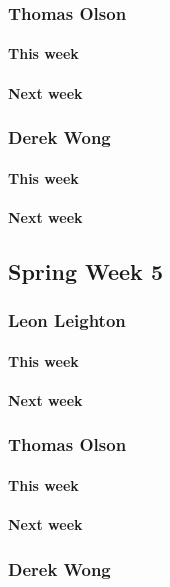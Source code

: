 \documentclass[10pt,letterpaper,onecolumn,draftclsnofoot]{IEEEtran}
\begin{document}
\subsubsection{Thomas Olson}
\paragraph{This week}
\paragraph{Next week}


\subsubsection{Derek Wong}
\paragraph{This week}
\paragraph{Next week}


\subsection{Spring Week 5}
\subsubsection{Leon Leighton}
\paragraph{This week}
\paragraph{Next week}


\subsubsection{Thomas Olson}
\paragraph{This week}
\paragraph{Next week}


\subsubsection{Derek Wong}
\end{document}
